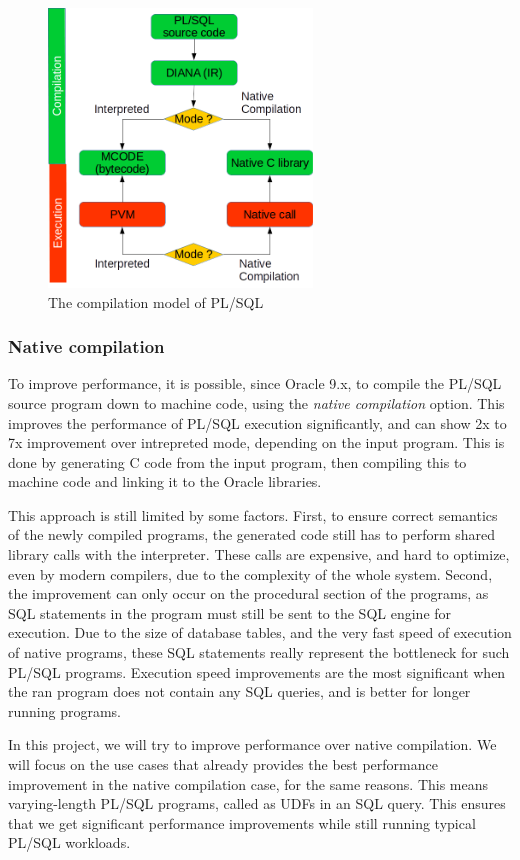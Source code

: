 \documentclass[twoside,11pt,a4paper]{article}
\begin{document}
\begin{figure}[bt]
	\centering
	\includegraphics[width=7cm]{./graphs/CompilationModel.png}
	\caption{The compilation model of PL/SQL}
\end{figure}

\subsubsection{Native compilation}

To improve performance, it is possible, since Oracle 9.x, to compile the PL/SQL source program down to machine code, using the \textit{native compilation} option. This improves the performance of PL/SQL execution significantly, and can show 2x to 7x improvement over intrepreted mode, depending on the input program. This is done by generating C code from the input program, then compiling this to machine code and linking it to the Oracle libraries.

This approach is still limited by some factors. First, to ensure correct semantics of the newly compiled programs, the generated code still has to perform shared library calls with the interpreter. These calls are expensive, and hard to optimize, even by modern compilers, due to the complexity of the whole system. Second, the improvement can only occur on the procedural section of the programs, as SQL statements in the program must still be sent to the SQL engine for execution. Due to the size of database tables, and the very fast speed of execution of native programs, these SQL statements really represent the bottleneck for such PL/SQL programs. Execution speed improvements are the most significant when the ran program does not contain any SQL queries, and is better for longer running programs.

In this project, we will try to improve performance over native compilation. We will focus on the use cases that already provides the best performance improvement in the native compilation case, for the same reasons. This means varying-length PL/SQL programs, called as UDFs in an SQL query. This ensures that we get significant performance improvements while still running typical PL/SQL workloads.
\end{document}
